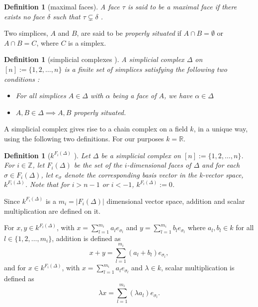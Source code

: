 \documentclass[11pt,a4paper,twoside]{report}
\newtheorem{mydef}[mythm]{Definition}
\begin{document}
\begin{mydef}[maximal faces]
A face $\tau$ is said to be a maximal face if there exists no face $\delta$ such that $\tau \subsetneq \delta$ \cite[p.15]{Jonsson}.
\end{mydef}

Two simplices, $A$ and $B$, are said to be \textit{properly situated} if $A\cap B=\emptyset$ or $A\cap B = C$, where $C$ is a simplex.\cite{Nadathur}

\begin{mydef}[simplicial complexes \cite{Nadathur}]\label{def:simplicial_complexes}
A simplicial complex $\Delta$ on $[n] := \{1,2,\dots ,n\}$ is a finite set of simplices satisfying the following two conditions :
\begin{itemize}
\item For all simplices $A\in\Delta$ with $\alpha$ being a face of $A$, we have $\alpha\in\Delta$
\item $A,B\in\Delta\implies A, B $ properly situated.
\end{itemize}
\end{mydef}

A simplicial complex gives rise to a chain complex on a field $k$, in a unique way, using the following two definitions. For our purposes $k=\mathbb{R}$.

\begin{mydef}[$k^{F_i(\Delta)}$ \cite{Allgaier}]
Let $\Delta$ be a simplicial complex on $[n] := \{1,2,\dots ,n\}$. For $i\in \mathbb{Z}$, let $F_i(\Delta)$ be the set of the $i$-dimensional faces of $\Delta$ and for each $\sigma\in F_i(\Delta)$, let $e_{\sigma}$ denote the corresponding basis vector in the k-vector space, $k^{F_i(\Delta)}$. Note that for $i>n-1$ or $i<-1$, $k^{F_i(\Delta)}:=0$.
\end{mydef}

Since $k^{F_i(\Delta)}$ is a $m_i = |F_i(\Delta)|$ dimensional vector space, addition and scalar multiplication are defined on it.

For $x,y\in k^{F_i(\Delta)}$, with $x = \sum_{l=1}^{m_i}a_le_{\sigma_l}$ and $y = \sum_{l=1}^{m_i}b_le_{\sigma_l}$ where $a_l,b_l\in k$ for all $l\in\{1,2,\dots,m_i\}$, addition is defined as 
\begin{equation*}
x+y = \sum_{l=1}^{m_i}(a_l+b_l)e_{\sigma_l},
\end{equation*}
and for $x\in k^{F_i(\Delta)}$, with $x = \sum_{l=1}^{m_i}a_le_{\sigma_l}$ and $\lambda \in k$, scalar multiplication is defined as 
\begin{equation*}
\lambda x = \sum_{l=1}^{m_i}(\lambda a_l)e_{\sigma_l}.
\end{equation*}
\end{document}
